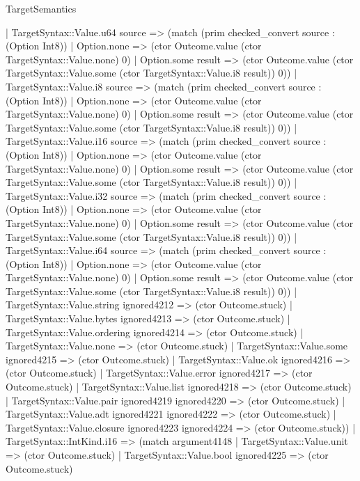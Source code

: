 \begin{lexlean}{TargetSemantics}
\begin{semanticmodule}
{            | TargetSyntax::Value.u64 source => (match (prim checked_convert source : (Option Int8))
              | Option.none => (ctor Outcome.value (ctor TargetSyntax::Value.none) 0)
              | Option.some result => (ctor Outcome.value (ctor TargetSyntax::Value.some (ctor TargetSyntax::Value.i8 result)) 0))
            | TargetSyntax::Value.i8 source => (match (prim checked_convert source : (Option Int8))
              | Option.none => (ctor Outcome.value (ctor TargetSyntax::Value.none) 0)
              | Option.some result => (ctor Outcome.value (ctor TargetSyntax::Value.some (ctor TargetSyntax::Value.i8 result)) 0))
            | TargetSyntax::Value.i16 source => (match (prim checked_convert source : (Option Int8))
              | Option.none => (ctor Outcome.value (ctor TargetSyntax::Value.none) 0)
              | Option.some result => (ctor Outcome.value (ctor TargetSyntax::Value.some (ctor TargetSyntax::Value.i8 result)) 0))
            | TargetSyntax::Value.i32 source => (match (prim checked_convert source : (Option Int8))
              | Option.none => (ctor Outcome.value (ctor TargetSyntax::Value.none) 0)
              | Option.some result => (ctor Outcome.value (ctor TargetSyntax::Value.some (ctor TargetSyntax::Value.i8 result)) 0))
            | TargetSyntax::Value.i64 source => (match (prim checked_convert source : (Option Int8))
              | Option.none => (ctor Outcome.value (ctor TargetSyntax::Value.none) 0)
              | Option.some result => (ctor Outcome.value (ctor TargetSyntax::Value.some (ctor TargetSyntax::Value.i8 result)) 0))
            | TargetSyntax::Value.string ignored4212 => (ctor Outcome.stuck)
            | TargetSyntax::Value.bytes ignored4213 => (ctor Outcome.stuck)
            | TargetSyntax::Value.ordering ignored4214 => (ctor Outcome.stuck)
            | TargetSyntax::Value.none => (ctor Outcome.stuck)
            | TargetSyntax::Value.some ignored4215 => (ctor Outcome.stuck)
            | TargetSyntax::Value.ok ignored4216 => (ctor Outcome.stuck)
            | TargetSyntax::Value.error ignored4217 => (ctor Outcome.stuck)
            | TargetSyntax::Value.list ignored4218 => (ctor Outcome.stuck)
            | TargetSyntax::Value.pair ignored4219 ignored4220 => (ctor Outcome.stuck)
            | TargetSyntax::Value.adt ignored4221 ignored4222 => (ctor Outcome.stuck)
            | TargetSyntax::Value.closure ignored4223 ignored4224 => (ctor Outcome.stuck))
          | TargetSyntax::IntKind.i16 => (match argument4148
            | TargetSyntax::Value.unit => (ctor Outcome.stuck)
            | TargetSyntax::Value.bool ignored4225 => (ctor Outcome.stuck)
}
\end{semanticmodule}
\end{lexlean}
